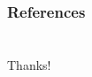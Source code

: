 \begin{frame}[allowframebreaks]
    \frametitle{References}
    \printbibliography
\end{frame}

\section{}
\begin{frame}[plain]
    \frametitle{}
    \centering
    \Huge
    Thanks!
\end{frame}


